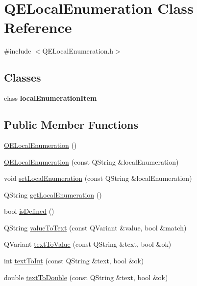 \hypertarget{classQELocalEnumeration}{
\section{QELocalEnumeration Class Reference}
\label{classQELocalEnumeration}
}


{\ttfamily \#include $<$QELocalEnumeration.h$>$}

\subsection*{Classes}
\begin{DoxyCompactItemize}
\item 
class {\bfseries localEnumerationItem}
\end{DoxyCompactItemize}
\subsection*{Public Member Functions}
\begin{DoxyCompactItemize}
\item 
\hyperlink{classQELocalEnumeration_ac2d9d220a4cf1bfdf117794ce8f5bdfe}{QELocalEnumeration} ()
\item 
\hyperlink{classQELocalEnumeration_aa25091ab008116b2c147637d60655bb2}{QELocalEnumeration} (const QString \&localEnumeration)
\item 
void \hyperlink{classQELocalEnumeration_a02c88ef391172ffa14ef28e97b97b1b6}{setLocalEnumeration} (const QString \&localEnumeration)
\item 
QString \hyperlink{classQELocalEnumeration_af879ad170bcd0a34ec5368fbe7a87248}{getLocalEnumeration} ()
\item 
bool \hyperlink{classQELocalEnumeration_ac403a3f983934abdfccc0aeeae8b5e99}{isDefined} ()
\item 
QString \hyperlink{classQELocalEnumeration_a90694b2cbede83e31e17d49508b38488}{valueToText} (const QVariant \&value, bool \&match)
\item 
QVariant \hyperlink{classQELocalEnumeration_ad978d0739cba24df376beb290f1ec4a8}{textToValue} (const QString \&text, bool \&ok)
\item 
int \hyperlink{classQELocalEnumeration_aea4fd8ef2e8379c9f78901b7fb1fd548}{textToInt} (const QString \&text, bool \&ok)
\item 
double \hyperlink{classQELocalEnumeration_aa0060a5549c456f4d995b531b0797cdf}{textToDouble} (const QString \&text, bool \&ok)
\end{DoxyCompactItemize}


